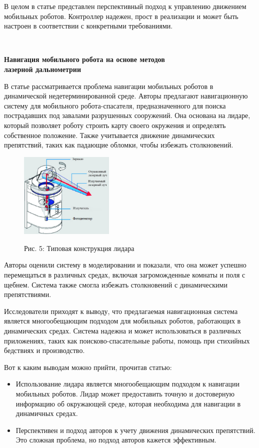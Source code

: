 \documentclass[russian,11pt]{article}
\providecommand{\header}[1]{
\,
\begin{center}
{\Large \textbf{#1}}
\end{center}
}
\begin{document}
В целом в статье представлен перспективный подход к управлению движением мобильных роботов. Контроллер надежен, прост в реализации и может быть настроен в соответствии с конкретными требованиями.

\pagebreak
\header{Навигация мобильного робота на основе методов\\лазерной дальнометрии \cite{4}}

В статье рассматривается проблема навигации мобильных роботов в динамической недетерминированной среде. Авторы предлагают навигационную систему для мобильного робота-спасателя, предназначенного для поиска пострадавших под завалами разрушенных сооружений. Она основана на лидаре, который позволяет роботу строить карту своего окружения и определять собственное положение. Также учитывается движение динамических препятствий, таких как падающие обломки, чтобы избежать столкновений.

\begin{figure}[!h]
\centering
\includegraphics[width=0.4\textwidth]{4_lidar}
\begin{center}{\footnotesize Рис. 5: Типовая конструкция лидара}\end{center}
\end{figure}

Авторы оценили систему в моделировании и показали, что она может успешно перемещаться в различных средах, включая загроможденные комнаты и поля с щебнем. Система также смогла избежать столкновений с динамическими препятствиями.

Исследователи приходят к выводу, что предлагаемая навигационная система является многообещающим подходом для мобильных роботов, работающих в динамических средах. Система надежна и может использоваться в различных приложениях, таких как поисково-спасательные работы, помощь при стихийных бедствиях и производство.

Вот к каким выводам можно прийти, прочитав статью:
\begin{itemize}
\item Использование лидара является многообещающим подходом к навигации мобильных роботов. Лидар может предоставить точную и достоверную информацию об окружающей среде, которая необходима для навигации в динамичных средах.
\item Перспективен и подход авторов к учету движения динамических препятствий. Это сложная проблема, но подход авторов кажется эффективным.
\end{itemize}
\end{document}

